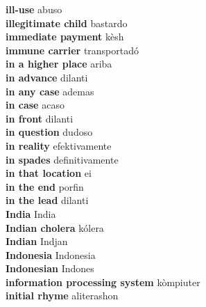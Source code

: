 \textbf{ ill-use  } abuso \\
\textbf{ illegitimate child  } bastardo \\
\textbf{ immediate payment  } kèsh \\
\textbf{ immune carrier  } transportadó \\
\textbf{ in a higher place  } ariba \\
\textbf{ in advance  } dilanti \\
\textbf{ in any case  } ademas \\
\textbf{ in case  } acaso \\
\textbf{ in front  } dilanti \\
\textbf{ in question  } dudoso \\
\textbf{ in reality  } efektivamente \\
\textbf{ in spades  } definitivamente \\
\textbf{ in that location  } ei \\
\textbf{ in the end  } porfin \\
\textbf{ in the lead  } dilanti \\
\textbf{ India  } India \\
\textbf{ Indian cholera  } kólera \\
\textbf{ Indian  } Indjan \\
\textbf{ Indonesia  } Indonesia \\
\textbf{ Indonesian  } Indones \\
\textbf{ information processing system  } kòmpiuter \\
\textbf{ initial rhyme  } aliterashon \\

